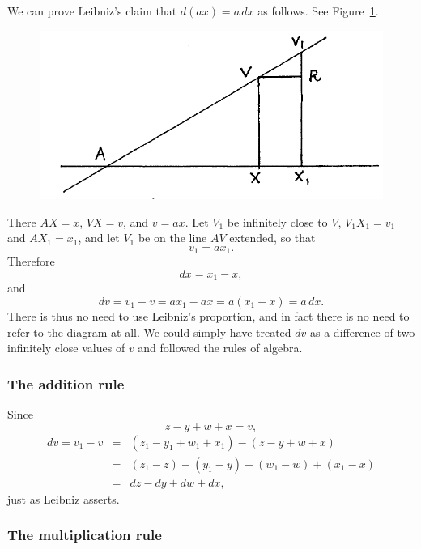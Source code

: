 \documentclass[polutonikogreek,english,twoside,openright]{article}
\begin{document}
We can prove Leibniz's claim that $d(ax) = a\,dx$ as follows.  See Figure~\ref{concoeff}. 
\begin{figure}[htp]
\begin{center}
\includegraphics[width=.75\textwidth]{fig/Figure13}
\caption{}
\label{concoeff}
\vspace{-10pt}
\end{center}
\end{figure} There $AX=x$, $VX =v$, and $v =ax$. Let $V_1$ be
infinitely close to $V$, $V_1X_1 =v_1$ and $AX_1 =x_1$, and let $V_1$
be on the line $AV$ extended, so that
$$v_1=ax_1.$$
Therefore 
$$dx = x_1 -x,$$
and
$$dv = v_1 - v =  ax_1 -ax = a(x_1 - x) = a\,dx.$$
There is thus no need to use Leibniz's proportion, and in fact there
is no need to refer to the diagram at all.  We could simply have
treated $dv$ as a difference of two infinitely close values of $v$ and
followed the rules of algebra.

\subsubsection*{The addition rule}

Since 
$$z-y+w+x = v,$$
\begin{eqnarray*}
dv = v_1 - v &  =  & (z_1 - y_1 + w_1 + x_1) - (z - y + w + x) \\
 & = & (z_1 - z) - (y_1 - y) + (w_1 -w) + (x_1 -x) \\
 & = & dz - dy + dw + dx,
 \end{eqnarray*}
 just as Leibniz asserts.
 
 \subsubsection*{The multiplication rule}
 
\end{document}
